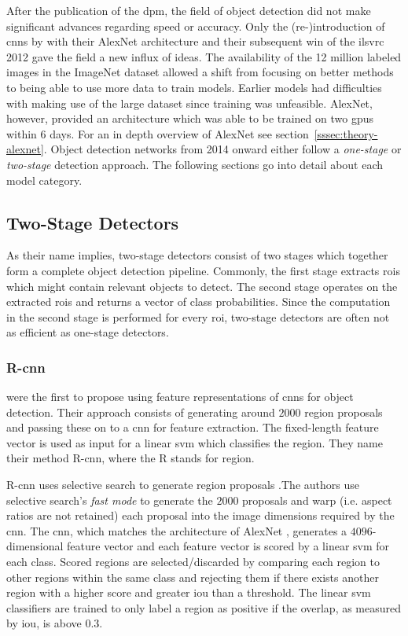 \documentclass[final]{vutinfth} %
\begin{document}
After the publication of the \gls{dpm}, the field of object detection
did not make significant advances regarding speed or accuracy. Only
the (re-)introduction of \glspl{cnn} by \textcite{krizhevsky2012} with
their AlexNet architecture and their subsequent win of the
\gls{ilsvrc} 2012 gave the field a new influx of ideas. The
availability of the 12 million labeled images in the ImageNet dataset
\cite{deng2009} allowed a shift from focusing on better methods to
being able to use more data to train models. Earlier models had
difficulties with making use of the large dataset since training was
unfeasible. AlexNet, however, provided an architecture which was able
to be trained on two \glspl{gpu} within 6 days. For an in depth
overview of AlexNet see section~\ref{sssec:theory-alexnet}. Object
detection networks from 2014 onward either follow a \emph{one-stage}
or \emph{two-stage} detection approach. The following sections go into
detail about each model category.

\subsection{Two-Stage Detectors}
\label{ssec:theory-two-stage}

As their name implies, two-stage detectors consist of two stages which
together form a complete object detection pipeline. Commonly, the
first stage extracts \glspl{roi} which might contain relevant objects
to detect. The second stage operates on the extracted \glspl{roi} and
returns a vector of class probabilities. Since the computation in the
second stage is performed for every \gls{roi}, two-stage detectors are
often not as efficient as one-stage detectors.

\subsubsection{R-\gls{cnn}}
\label{sssec:theory-rcnn}

\textcite{girshick2014} were the first to propose using feature
representations of \glspl{cnn} for object detection. Their approach
consists of generating around $2000$ region proposals and passing
these on to a \gls{cnn} for feature extraction. The fixed-length
feature vector is used as input for a linear \gls{svm} which
classifies the region. They name their method R-\gls{cnn}, where the R
stands for region.

R-\gls{cnn} uses selective search to generate region proposals
\cite{uijlings2013}.The authors use selective search's \emph{fast
mode} to generate the $2000$ proposals and warp (i.e. aspect ratios
are not retained) each proposal into the image dimensions required by
the \gls{cnn}. The \gls{cnn}, which matches the architecture of
AlexNet \cite{krizhevsky2012}, generates a $4096$-dimensional feature
vector and each feature vector is scored by a linear \gls{svm} for
each class. Scored regions are selected/discarded by comparing each
region to other regions within the same class and rejecting them if
there exists another region with a higher score and greater \gls{iou}
than a threshold. The linear \gls{svm} classifiers are trained to only
label a region as positive if the overlap, as measured by \gls{iou},
is above $0.3$.
\end{document}
